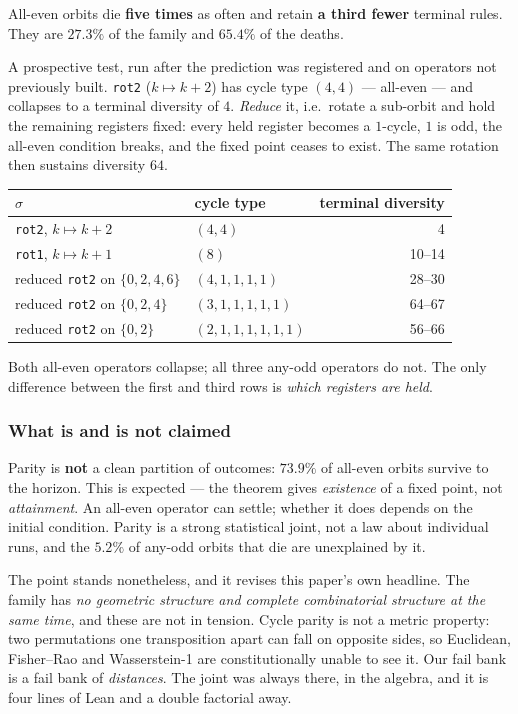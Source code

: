 \documentclass[man,12pt,floatsintext]{apa7}
\begin{document}
All-even orbits die \textbf{five times} as often and retain \textbf{a third
fewer} terminal rules. They are $27.3\%$ of the family and $65.4\%$ of the
deaths.

A prospective test, run after the prediction was registered and on operators not
previously built. \texttt{rot2} ($k \mapsto k+2$) has cycle type $(4,4)$ ---
all-even --- and collapses to a terminal diversity of $4$. \emph{Reduce} it, i.e.\
rotate a sub-orbit and hold the remaining registers fixed: every held register
becomes a $1$-cycle, $1$ is odd, the all-even condition breaks, and the fixed
point ceases to exist. The same rotation then sustains diversity $64$.

\begin{center}
\begin{tabular}{llr}
  \toprule
  $\sigma$ & cycle type & terminal diversity \\
  \midrule
  \texttt{rot2}, $k \mapsto k+2$        & $(4,4)$             & 4 \\
  \texttt{rot1}, $k \mapsto k+1$        & $(8)$               & 10--14 \\
  reduced \texttt{rot2} on $\{0,2,4,6\}$ & $(4,1,1,1,1)$       & 28--30 \\
  reduced \texttt{rot2} on $\{0,2,4\}$   & $(3,1,1,1,1,1)$     & 64--67 \\
  reduced \texttt{rot2} on $\{0,2\}$     & $(2,1,1,1,1,1,1)$   & 56--66 \\
  \bottomrule
\end{tabular}
\end{center}

Both all-even operators collapse; all three any-odd operators do not. The only
difference between the first and third rows is \emph{which registers are held}.

\subsubsection{What is and is not claimed}

Parity is \textbf{not} a clean partition of outcomes: $73.9\%$ of all-even
orbits survive to the horizon. This is expected --- the theorem gives
\emph{existence} of a fixed point, not \emph{attainment}. An all-even operator
can settle; whether it does depends on the initial condition. Parity is a strong
statistical joint, not a law about individual runs, and the $5.2\%$ of any-odd
orbits that die are unexplained by it.

The point stands nonetheless, and it revises this paper's own headline. The
family has \emph{no geometric structure and complete combinatorial structure at
the same time}, and these are not in tension. Cycle parity is not a metric
property: two permutations one transposition apart can fall on opposite sides,
so Euclidean, Fisher--Rao and Wasserstein-1 are constitutionally unable to see
it. Our fail bank is a fail bank of \emph{distances}. The joint was always
there, in the algebra, and it is four lines of Lean and a double factorial away.
\end{document}
